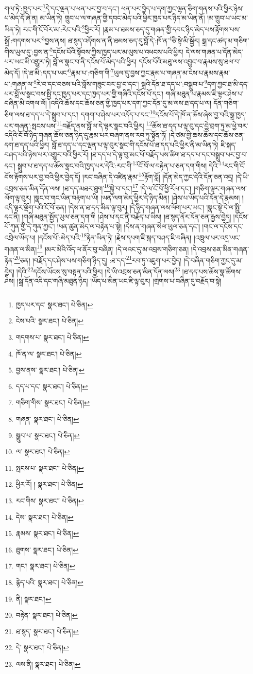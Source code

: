 གལ་ཏེ་:ཁྱད་པར་\footnote{ཁྱད་པར་དང་  སྣར་ཐང་།  པེ་ཅིན། }དེ་དང་ལྡན་པ་ཕན་པར་བྱ་བ་དང་། ཕན་པར་བྱེད་པ་དག་ཀྱང་ལྷན་ཅིག་གནས་པའི་ཕྱིར་ཉེས་པ་མེད་དོ་ཞེ་ན། མ་ཡིན་ཏེ། གྲུབ་པ་ལ་གཞན་གྱི་དབང་མེད་པའི་ཕྱིར་ཁྱད་པར་ཉིད་མ་ཡིན་ནོ། །མ་གྲུབ་པ་ཡང་མ་ཡིན་ཏེ། རང་གི་ངོ་བོར་མ་:རེང་པའི་\footnote{ངེས་པའི་  སྣར་ཐང་།  པེ་ཅིན། }ཕྱིར་རོ། །རྣམ་པ་ཐམས་ཅད་དུ་གཞན་གྱི་དབང་ཉིད་མེད་པས་རྟོགས་པས་སྒྲོ་:གདགས་པར་\footnote{གདགས་པ་  སྣར་ཐང་།  པེ་ཅིན། }བྱས་ནས། ཐ་སྙད་འདོགས་ན་ནི་ཐམས་ཅད་དུ་བློ་དེ་:ཁོ་ན་\footnote{ཁོ་ན་ལ་  སྣར་ཐང་།  པེ་ཅིན། }ཅི་སྟེ་མི་སྦྱོར། སྒྲ་དང་ཚད་མ་གཅིག་གིས་ཡུལ་དུ་:བྱས་ན་\footnote{བྱས་ནས་  སྣར་ཐང་།  པེ་ཅིན། }དངོས་པོའི་སྟོབས་ཀྱིས་ཁྱད་པར་མ་ལུས་པ་འཕངས་པའི་ཕྱིར། དེ་ལས་གཞན་པ་དོན་མེད་པར་ཡང་མི་འགྱུར་ཏེ། བློ་ལ་སྣང་བ་ནི་དངོས་པོ་མེད་པའི་ཕྱིར། དངོས་པོའི་མཐུ་ལས་འབྱུང་བ་རྣམས་སུ་ཐལ་བ་མེད་དོ། །དེ་ཐ་མི་:དད་པ་ཡང་\footnote{དད་པ་དང་  སྣར་ཐང་།  པེ་ཅིན། }རྣམ་པ་:གཅིག་གི་\footnote{གཅིག་གིས་  སྣར་ཐང་།  པེ་ཅིན། }ཡུལ་དུ་བྱས་ཀྱང་རྣམ་པ་གཞན་མ་ངེས་པ་རྣམས་རྣམ་པ་:གཞན་ལ་\footnote{གཞན་  སྣར་ཐང་།  པེ་ཅིན། }རེ་བ་དང་བཅས་པའི་བློས་གཟུང་བར་བྱ་བ་དང་། སྒྲའི་དོན་ཐ་དད་པ་:བསྒྲུབ་པ་\footnote{སྒྲུབ་པ་  སྣར་ཐང་།  པེ་ཅིན། }དག་ཀྱང་ཐ་མི་དད་པར་བློ་ལ་སྣང་བས་སྤྱི་དང་ཁྱད་པར་དང་ཁྱད་པར་གྱི་གཞིའི་དངོས་པོ་དང་། གཞི་མཐུན་པ་རྣམས་ཇི་ལྟར་ཤེས་པ་བཞིན་མི་འགལ་ལོ། །འདིའི་ཆོས་དང་ཆོས་ཅན་གྱི་ཁྱད་པར་དག་ཀྱང་དོན་དུ་མ་ལས་ཐ་དད་པ་ལ། དོན་གཅིག་ཅིག་ལས་ཐ་དད་པ་དེ་སྒྲུབ་པ་དང་། དགག་པ་ཤེས་པར་འདོད་པ་དང་\footnote{ལ་  སྣར་ཐང་།  པེ་ཅིན། }དངོས་པོ་དེ་ཁོ་ན་ཆོས་ཞེས་བྱ་བའི་སྒྲ་ཁྱད་པར་གཞན་:སྤངས་པས་\footnote{སྤངས་པ་  སྣར་ཐང་།  པེ་ཅིན། }བརྗོད་ནས་བློ་ལ་དེ་ལྟར་སྣང་བའི་ཕྱིར། \footnote{ཕྱིར་རོ། །   སྣར་ཐང་།  པེ་ཅིན། }ཆོས་ཐ་དད་པ་ལྟ་བུ་དང་བྱེ་བྲག་ཏུ་མ་ཕྱེ་བར་འདིའི་ངོ་བོ་ཉིད་གཞན་ཆོས་ཅན་ཉིད་དུ་རྣམ་པར་བཞག་ནས་རབ་ཏུ་སྟོན་ཏོ། །དེ་ཙམ་གྱི་ཆས་ཆོས་དང་ཆོས་ཅན་དག་ཐ་དད་པའི་ཕྱིར། བློ་ཐ་དད་པ་དང་ལྡན་པ་ལྟ་བུར་སྣང་གི་དངོས་པོ་ཐ་དད་པའི་ཕྱིར་ནི་མ་ཡིན་ཏེ། ཇི་སྐད་བཤད་པའི་ཉེས་པར་འགྱུར་བའི་ཕྱིར་རོ། །ཐ་དད་པ་དེ་ལྟ་བུ་མང་པོ་བརྗོད་པས་ཚིག་ཐ་དད་པ་དང་བསྒྲུབ་པར་བྱ་བ་དང་། སྒྲུབ་པ་ཐ་དད་པ་ཆོས་སྣང་བའི་ཁྱད་པར་དེའི་:རང་གི་\footnote{རང་གིས་  སྣར་ཐང་།  པེ་ཅིན། }ངོ་བོ་ལ་བརྟེན་པ་ཅན་དག་གིས། དེའི་\footnote{དེས་  སྣར་ཐང་།  པེ་ཅིན། }རང་གི་ངོ་བོས་རྟོགས་པར་བྱ་བའི་ཕྱིར་བྱེད་དོ། །རང་བཞིན་དེ་འཛིན་རྣམ་\footnote{རྣམས་  སྣར་ཐང་།  པེ་ཅིན། }རྟོག་བློ། །དོན་མེད་ཀྱང་དེའི་དོན་ཅན་འདྲ། །དེ་ཡི་འབྲས་ཅན་མིན་དོན་ལས། །ཐ་དད་མཐར་ཐུག་\footnote{ཐུགས་  སྣར་ཐང་།  པེ་ཅིན། }སྐྱེ་བ་དང་།\footnote{གང་།  སྣར་ཐང་།  པེ་ཅིན། } །དེ་ལ་ངོ་བོ་ཕྱི་རོལ་དང་། །གཅིག་ལྟར་གཞན་ལས་ལོག་ལྟ་བུར། །སྣང་བ་གང་ཡིན་བརྟག་པ་ཡི། །ཡན་ལག་མེད་ཕྱིར་དེ་ཉིད་མིན། །ཤེས་པ་ཡོད་པའི་དོན་དེ་རྣམས། །འདི་ལྟར་ལྡོག་པའི་ངོ་བོ་ཅན། །དེས་ན་ཐ་དད་མིན་ལྟ་བུར། །དེ་ཉིད་གཞན་ལས་ལོག་པར་ཡང་། །སྣང་སྟེ་དེ་ལ་སྤྱི་དང་ནི། །གཞི་མཐུན་སྤྱོད་ཡུལ་ཅན་དག་གི །ཤེས་པ་དང་ནི་བརྗོད་པ་ཡིས། །ཐ་སྙད་ནོར་དོན་ཅན་རྒྱས་བྱེད། །དངོས་པོ་ཀུན་གྱི་དེ་ཀུན་ཀྱང་། །ཕན་ཚུན་མེད་ལ་བརྟེན་པ་སྟེ། །དེས་ན་གཞན་སེལ་ཡུལ་ཅན་དང་། །གང་ལ་དངོས་དང་འབྲེལ་ཡོད་པ། །དངོས་པོ་:མེད་པའི་\footnote{རྙེད་པའི་  སྣར་ཐང་།  པེ་ཅིན། }རྟེན་ཡིན་ཏེ། །རྗེས་དཔག་ཇི་སྐད་བཤད་ཇི་བཞིན། །འཁྲུལ་པར་འདྲ་ཡང་གཞན་ལ་མིན།\footnote{ནི།  སྣར་ཐང་། } །མར་མེའི་འོད་ལ་ནོར་བུ་བཞིན། །དེ་ལའང་དུ་མ་འབྲས་གཅིག་ཅན། །དེ་འབྲས་ཅན་མིན་གཞན་རྟེན་\footnote{བརྟེན་  སྣར་ཐང་།  པེ་ཅིན། }ཅན། །བརྗོད་དང་ཤེས་པས་གཅིག་ཉིད་དུ། :ཐ་དད་\footnote{ཐ་སྙད་  སྣར་ཐང་།  པེ་ཅིན། }རབ་ཏུ་འཇུག་པར་བྱེད། །དེ་བཞིན་གཅིག་ཀྱང་དུ་མ་བྱེད། །དེའི་\footnote{དེ་  སྣར་ཐང་།  པེ་ཅིན། }དངོས་ཡོངས་སུ་བསྟན་པའི་ཕྱིར། །དེ་ཡི་འབྲས་ཅན་མིན་དོན་ལས།\footnote{ལས་ནི།  སྣར་ཐང་།  པེ་ཅིན། } །ཐ་དད་པས་ཆོས་སྣ་ཚོགས་ཤེས། །སྒྲ་དོན་འདི་དང་གཞི་མཐུན་ཉིད། །ཡོད་པ་མིན་ཡང་ཇི་ལྟ་བུར། །གྲགས་པ་བཞིན་དུ་བརྗོད་བ་སྟེ། 